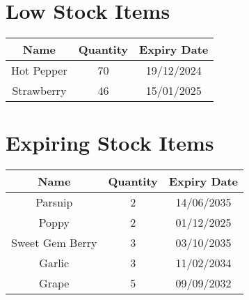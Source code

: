 \documentclass{article}
\begin{document}
\section*{Low Stock Items}
\begin{tabular}{|c|c|c|}
\hline
Name & Quantity & Expiry Date\\
\hline
Hot Pepper & 70 & 19/12/2024 \\
\hline
Strawberry & 46 & 15/01/2025 \\
\hline
\end{tabular}

\section*{Expiring Stock Items}
\begin{tabular}{|c|c|c|}
\hline
Name & Quantity & Expiry Date\\
\hline
Parsnip & 2 & 14/06/2035 \\
\hline
Poppy & 2 & 01/12/2025 \\
\hline
Sweet Gem Berry & 3 & 03/10/2035 \\
\hline
Garlic & 3 & 11/02/2034 \\
\hline
Grape & 5 & 09/09/2032 \\
\hline
\end{tabular}
\end{document}
